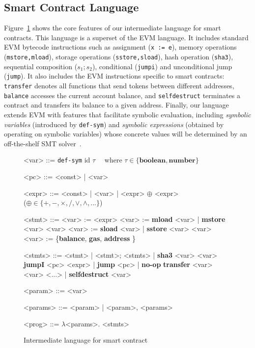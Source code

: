 \subsection{Smart Contract Language}\label{sec:lang}

Figure~\ref{fig:grammar} shows the core features of our intermediate language
for smart contracts. This language is a superset of the EVM language. It includes
standard EVM bytecode instructions such as assignment (\texttt{x := e}), memory operations
(\texttt{mstore,mload}), storage operations (\texttt{sstore,sload}), hash
operation (\texttt{sha3}), sequential composition (\texttt{$s_1;s_2$}),
conditional (\texttt{jumpi}) and unconditional jump (\texttt{jump}). It also
includes the EVM instructions specific to smart contracts: \texttt{transfer}
denotes all functions that send tokens between different addresses, \texttt{balance} accesses the current account
balance, and \texttt{selfdestruct} terminates a contract and transfers its
balance to a given address. Finally, our language extends EVM with features that
facilitate symbolic evaluation, including \emph{symbolic variables} (introduced
by \texttt{def-sym}) and \emph{symbolic expressions} (obtained by operating on
symbolic variables) whose concrete values will be determined by an off-the-shelf
SMT solver~\cite{NiemetzPreinerBiere-JSAT15}.

\begin{figure}[!t]
    \setlength{\grammarparsep}{0em}
    \begin{grammar}
    \small
<var>  ::= \texttt{def-sym} id $\tau$  \ \ where 
$\tau\in\{\textbf{boolean}, \textbf{number}\}\quad$

<pc>   ::= <const> | <var>

<expr> ::= <const> | <var> | <expr> $\oplus$ <expr> \\
($\oplus\in\{+, -, \times, /, \vee, \wedge, ...\}$)

<stmt> ::=  <var> := <expr> 
  \alt <var> := \textbf{mload} <var> | \textbf{mstore} <var> <var>
  \alt <var> := \textbf{sload} <var> | \textbf{sstore} <var> <var>
  \alt <var> := \{\textbf{balance}, \textbf{gas}, \textbf{address} \}

<stmts> ::= <stmt> | <stmt>; <stmts> | \textbf{sha3} <var> <var>
\alt \textbf{jumpI} <pc> <expr> | \textbf{jump} <pc> | \textbf{no-op}
\alt \textbf{transfer} <var> <var> <...> | \textbf{selfdestruct} <var>

<param> ::= <var> 

<params> ::= <param> | <param>, <params> 

<prog> ::= $\lambda$<params>. <stmts> 
\end{grammar}
\vspace{-0.2in}
\caption{Intermediate language for smart contract}
\vspace{-0.1in}
\label{fig:grammar}
\end{figure}



